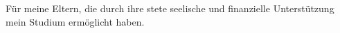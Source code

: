 \thispagestyle{empty}

\vspace*{3cm}

\begin{center}
    Für meine Eltern, die durch ihre stete seelische und finanzielle Unterstützung mein Studium ermöglicht haben.
\end{center}
